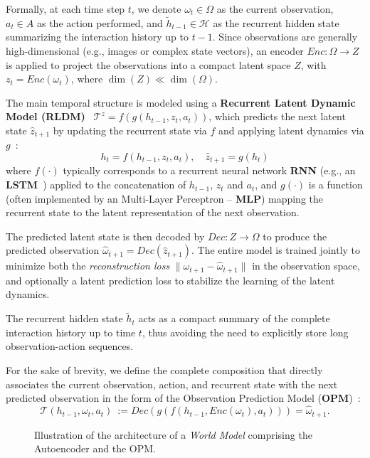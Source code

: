 \documentclass[pdflatex,sn-mathphys-num]{sn-jnl}%
\theoremstyle{thmstyleone}%
\theoremstyle{thmstyletwo}%
\theoremstyle{thmstylethree}%
\begin{document}
Formally, at each time step $t$, we denote $\omega_t \in \Omega$ as the current observation, $a_t \in A$ as the action performed, and $\tilde{h}_{t-1} \in \mathcal{H}$ as the recurrent hidden state summarizing the interaction history up to $t-1$. Since observations are generally high-dimensional (e.g., images or complex state vectors), an encoder $Enc: \Omega \rightarrow Z$ is applied to project the observations into a compact latent space $Z$, with $z_t = Enc(\omega_t)$, where $\dim(Z) \ll \dim(\Omega)$.

The main temporal structure is modeled using a \textbf{Recurrent Latent Dynamic Model (\textbf{RLDM})}~\cite{hafner2020dream} $\mathcal{T}^{z} = f(g(h_{t-1}, z_t, a_t))$, which predicts the next latent state $\hat{z}_{t+1}$ by updating the recurrent state via $f$ and applying latent dynamics via $g$~:
\[
    h_t = f(h_{t-1}, z_t, a_t), \quad \hat{z}_{t+1} = g(h_t)
\]
where $f(\cdot)$ typically corresponds to a recurrent neural network \textbf{RNN} (e.g., an \textbf{LSTM}~\cite{hochreiter1997long}) applied to the concatenation of $h_{t-1} $, $z_t$ and $a_t$, and $g(\cdot)$ is a function (often implemented by an Multi-Layer Perceptron -- \textbf{MLP}) mapping the recurrent state to the latent representation of the next observation.

The predicted latent state is then decoded by $Dec: Z \rightarrow \Omega$ to produce the predicted observation $\hat{\omega}_{t+1} = Dec(\hat{z}_{t+1})$. The entire model is trained jointly to minimize both the \emph{reconstruction loss} $\|\omega_{t+1} - \hat{\omega}_{t+1}\|$ in the observation space, and optionally a latent prediction loss to stabilize the learning of the latent dynamics.

The recurrent hidden state $\tilde{h}_t$ acts as a compact summary of the complete interaction history up to time $t$, thus avoiding the need to explicitly store long observation-action sequences.

For the sake of brevity, we define the complete composition that directly associates the current observation, action, and recurrent state with the next predicted observation in the form of the Observation Prediction Model (\textbf{OPM})~:
\[
    \mathcal{T}(h_{t-1}, \omega_t, a_t)~:= Dec(g(f(h_{t-1}, Enc(\omega_t), a_t))) = \hat{\omega}_{t+1}.
\]

\begin{figure}[h!]
    \centering
    \resizebox{\textwidth}{!}{%
        
    }
    \caption{Illustration of the architecture of a \textit{World Model} comprising the Autoencoder and the OPM.}
    \label{fig:single_agent_world_model}
\end{figure}
\end{document}
